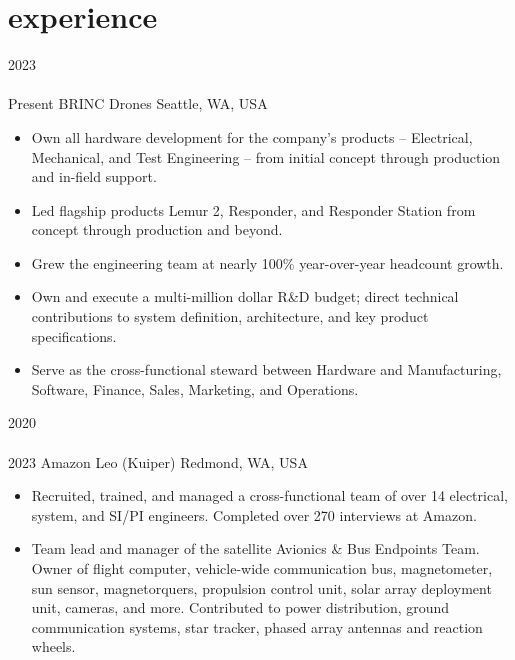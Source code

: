 
\section{experience}

\begin{entrylist}
\entry
  {2023\\\faChevronDown\\Present}
  {BRINC Drones}
  {Seattle, WA, USA}
  {
\begin{itemize}[leftmargin=12pt]
  \item Own all hardware development for the company's products -- Electrical, Mechanical, and Test Engineering -- from initial concept through production and in-field support.
  \item Led flagship products Lemur 2, Responder, and Responder Station from concept through production and beyond.
  \item Grew the engineering team at nearly 100\% year-over-year headcount growth.
  \item Own and execute a multi-million dollar R\&D budget; direct technical contributions to system definition, architecture, and key product specifications.
  \item Serve as the cross-functional steward between Hardware and Manufacturing, Software, Finance, Sales, Marketing, and Operations.
\end{itemize}
}
\entry
  {2020\\\faChevronDown\\2023}
  {Amazon Leo (Kuiper)}
  {Redmond, WA, USA}
  {
\begin{itemize}[leftmargin=12pt]
  \item Recruited, trained, and managed a cross-functional team of over 14 electrical, system, and SI/PI engineers. Completed over 270 interviews at Amazon.
  \item Team lead and manager of the satellite Avionics \& Bus Endpoints Team. Owner of flight computer, vehicle-wide communication bus, magnetometer, sun sensor, magnetorquers, propulsion control unit, solar array deployment unit, cameras, and more. Contributed to power distribution, ground communication systems, star tracker, phased array antennas and reaction wheels.  

\end{itemize}}
\end{entrylist}
